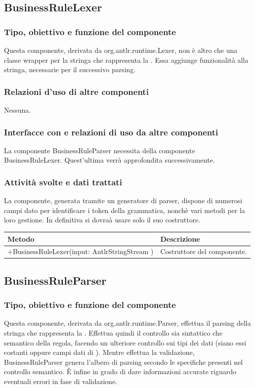 \documentclass[11pt,titlepage,a4paper]{report}
\begin{document}
\subsection{BusinessRuleLexer}
\subsubsection{Tipo, obiettivo e funzione del componente}
Questa componente, derivata da org.antlr.runtime.Lexer, non \`e altro che una classe wrapper per la stringa che rappresenta la \br. Essa aggiunge funzionalit\`a alla stringa, necessarie per il successivo parsing.
\subsubsection{Relazioni d'uso di altre componenti}
Nessuna.
\subsubsection{Interfacce con e relazioni di uso da altre componenti}
La componente BusinessRuleParser necessita della componente BusinessRuleLexer. Quest'ultima verr\`a approfondita successivamente.
\subsubsection{Attivit\`a svolte e dati trattati}
La componente, generata tramite un generatore di parser, dispone di numerosi campi dato per identificare i token della grammatica, nonch\`e vari metodi per la loro gestione. In definitiva si dovra\`a usare solo il suo costruttore.
\begin{center}
\begin{tabular}{||p{6cm}||p{6cm}||} \hline
\hline
Metodo & Descrizione \\  \hline
+BusinessRuleLexer(input: AntlrStringStream ) & Costruttore del componente.\\ \hline
\end{tabular}
\end{center}

\subsection{BusinessRuleParser}
\subsubsection{Tipo, obiettivo e funzione del componente}
Questa componente, derivata da org.antlr.runtime.Parser, effettua il parsing della stringa che rappresenta la \br. Effettua quindi il controllo sia sintattico che semantico della regola, facendo un ulteriore controllo sui tipi dei dati (siano essi costanti oppure campi dati di \bos). Mentre effettua la validazione, BusinessRuleParser genera l'albero di parsing secondo le specifiche presenti nel controllo semantico. \`E infine in grado di dare informazioni accurate riguardo eventuali errori in fase di validazione.
\end{document}
